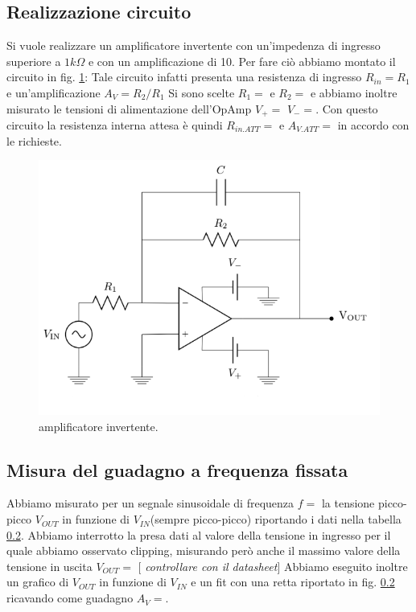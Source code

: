 \documentclass[10pt,a4paper]{article}
\newcommand{\rem}[1]{[\emph{#1}]}
\begin{document}
\subsection{Realizzazione circuito}
Si vuole realizzare un amplificatore invertente con un'impedenza di ingresso superiore a $1k\Omega$ e con un amplificazione di 10. 
Per fare ciò abbiamo montato il circuito in fig. \ref{opampinvert}: Tale circuito infatti presenta una  resistenza di ingresso $R_{in}=R_1$ e un'amplificazione  $A_V=R_2/R_1$ 
Si sono scelte $R_1=$ e $R_2=$ e abbiamo inoltre misurato le  tensioni di alimentazione dell'OpAmp $V_+=$ $V_-=$.
Con questo circuito la resistenza interna attesa è quindi $R_{in.ATT}=$ e $A_{V.ATT}=$ in accordo con le richieste.
\begin{figure}[!htb]
  \centering
  \includegraphics[scale=0.5]{opampinvert.png}
\caption{amplificatore invertente.}
\label{opampinvert}
\end{figure}
\subsection{Misura del guadagno a frequenza fissata}
Abbiamo misurato per un segnale sinusoidale di frequenza $f=$ la tensione picco-picco $V_{OUT}$ in funzione di $V_{IN}$(sempre picco-picco) riportando i dati nella tabella \ref{}. Abbiamo interrotto la presa dati al valore della tensione in ingresso per il quale abbiamo osservato clipping, misurando però anche il massimo valore della tensione in uscita  $V_{OUT} = $ \rem{ controllare con il datasheet}
Abbiamo eseguito inoltre un grafico di $V_{OUT}$ in funzione di $V_{IN}$ e un fit con una retta riportato in fig. \ref{} ricavando come guadagno $A_V=$.
\end{document}
